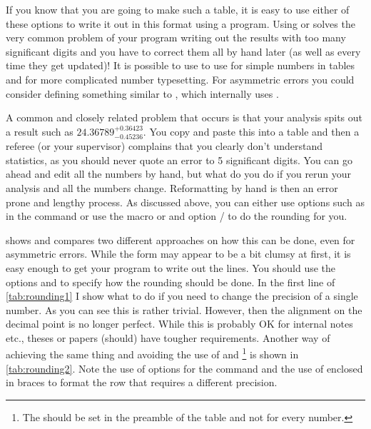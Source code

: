 If you know that you are going to make such a table, it is easy
to use either of these options to write it out in this format using a program. 
Using  or  solves the very common problem of your
program writing out the results with too many significant digits and
you have to correct them all by hand later (as well as every time they
get updated)!  
It is possible to use to use  for simple numbers in tables
and  for more complicated number typesetting. 
For asymmetric errors you could
consider defining something similar to , which
internally uses .

A common and closely related problem that occurs is that your analysis
spits out a result such as \(24.36789^{+0.36423}_{-0.45236}\). You copy
and paste this into a table and then a referee (or your supervisor)
complains that you clearly don't understand statistics, as you should
never quote an error to 5 significant digits. You can go ahead and
edit all the numbers by hand, but what do you do if you rerun your
analysis and all the numbers change.
Reformatting by hand is then an error prone and lengthy process.
As discussed above, you can either use options such as 
 in the  command or use the macro
 or  
and option / to do the
rounding for you.

 shows and compares two different approaches
on how this can be done, even for asymmetric errors.
While the form
may appear to be a bit clumsy at first, it is easy enough to get your
program to write out the lines. 
You should use the options  and
 to specify how the rounding should be done.
In the first line of \cref{tab:rounding1}
I show what to do if you need to change the precision of a single number.
As you can see this is rather trivial.
However, then the alignment on the decimal point is no longer perfect.
While this is probably OK for internal notes etc.,
theses or papers (should) have tougher requirements.
Another way of achieving the same thing and
avoiding the use of  and
\footnote{%
  The  should be set in the preamble of the table and
  not for every number.}
is shown in \cref{tab:rounding2}.
Note the use of options for the  command
and the use of  enclosed in braces
to format the row that requires a different precision.

